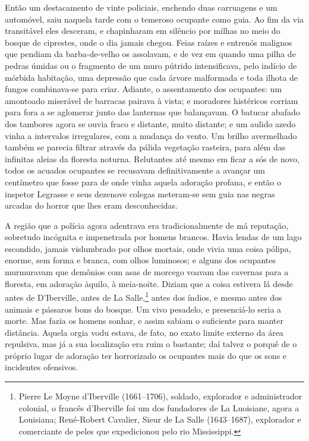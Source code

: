 Então um destacamento de vinte policiais, enchendo duas carruagens e um
automóvel, saiu naquela tarde com o temeroso ocupante como guia. Ao fim
da via transitável eles desceram, e chapinharam em silêncio por milhas
no meio do bosque de ciprestes, onde o dia jamais chegou. Feias raízes e
entrenós malignos que pendiam da barba-de-velho os assolavam, e de vez
em quando uma pilha de pedras úmidas ou o fragmento de um muro pútrido
intensificava, pelo indício de mórbida habitação, uma depressão que cada
árvore malformada e toda ilhota de fungos combinava-se para criar.
Adiante, o assentamento dos ocupantes: um amontoado miserável de
barracas pairava à vista; e moradores histéricos corriam para fora a se
aglomerar junto das lanternas que balançavam. O batucar abafado dos
tambores agora se ouvia fraco e distante, muito distante; e um aulido
azedo vinha a intervalos irregulares, com a mudança do vento. Um brilho
avermelhado também se parecia filtrar através da pálida vegetação
rasteira, para além das infinitas aleias da floresta noturna. Relutantes
até mesmo em ficar a sós de novo, todos os acuados ocupantes se
recusavam definitivamente a avançar um centímetro que fosse para de onde
vinha aquela adoração profana, e então o inspetor Legrasse e seus
dezenove colegas meteram-se sem guia nas negras arcadas do horror que
lhes eram desconhecidas.

A região que a polícia agora adentrava era tradicionalmente de má
reputação, sobretudo incógnita e impenetrada por homens brancos. Havia
lendas de um lago escondido, jamais vislumbrado por olhos mortais, onde
vivia uma coisa pólipa, enorme, sem forma e branca, com olhos luminosos;
e alguns dos ocupantes murmuravam que demônios com asas de morcego
voavam das cavernas para a floresta, em adoração àquilo, à meia-noite.
Diziam que a coisa estivera lá desde antes de D'Iberville, antes de La
Salle,\footnote{Pierre Le Moyne d'Iberville (1661--1706), soldado,
  explorador e administrador colonial, o francês d'Iberville foi um dos
  fundadores de La Luoisiane, agora a Louisiana; René-Robert Cavalier,
  Sieur de La Salle (1643--1687), explorador e comerciante de peles que
  expedicionou pelo rio Mississippi.} antes dos índios, e mesmo antes
dos animais e pássaros bons do bosque. Um vivo pesadelo, e presenciá-lo
seria a morte. Mas fazia os homens sonhar, e assim sabiam o suficiente
para manter distância. Aquela orgia vodu estava, de fato, no exato
limite externo da área repulsiva, mas já a sua localização era ruim o
bastante; daí talvez o porquê de o próprio lugar de adoração ter
horrorizado os ocupantes mais do que os sons e incidentes ofensivos.

